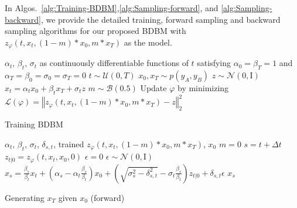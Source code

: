 In Algos.~\ref{alg:Training-BDBM},\ref{alg:Sampling-forward}, and
\ref{alg:Sampling-backward}, we provide the detailed training, forward
sampling and backward sampling algorithms for our proposed BDBM with
$z_{\varphi}\left(t,x_{t},\left(1-m\right)*x_{0},m*x_{T}\right)$
as the model.

\begin{algorithm}
\begin{algorithmic}[1]
 $\alpha_t$, $\beta_t$, $\sigma_t$ as continuously differentiable functions of $t$ satisfying  $\alpha_{0}=\beta_{T}=1$ and $\alpha_{T}=\beta_{0}=\sigma_{0}=\sigma_{T}=0$     
\Repeat     
	\State $t \sim \mathcal{U} \left(0,T \right)$ 
	\State $x_0, x_T \sim p(y_A, y_B)$     
	\State $z \sim \mathcal{N}(0, \mathrm{I})$     
	\State $x_t = \alpha_t x_0 + \beta_t x_T + \sigma_t z$     
	\State $m \sim \mathcal{B}(0.5)$     
	\State Update $\varphi$ by minimizing $\mathcal{L}(\varphi) = \left\Vert z_{\varphi}\left(t,x_{t},\left(1-m\right)*x_{0},m*x_{T}\right)-z\right\Vert _{2}^{2}$     
\end{algorithmic}\caption{Training BDBM \label{alg:Training-BDBM}}
\end{algorithm}

\begin{algorithm}
\begin{algorithmic}[1] 
 $\alpha_t$, $\beta_t$, $\sigma_t$, $\delta_{s,t}$, trained $z_{\varphi}\left(t,x_{t},\left(1-m\right)*x_{0},m*x_{T}\right)$, $x_0$
\State $m=0$
	\State $s = t + \Delta t$
	\State $z_{t|0} = z_{\varphi}\left(t,x_{t},x_{0},0\right)$
		\State $\epsilon = 0$
    \Else         
		\State $\epsilon \sim \mathcal{N}(0, \mathrm{I})$
    \EndIf     
	\State $x_{s}= \frac{\beta_{s}}{\beta_{t}} x_{t} + \left(\alpha_{s} - \alpha_{t}\frac{\beta_{s}}{\beta_{t}}\right)x_{0} + \left(\sqrt{\sigma_{s}^{2}-\delta_{s,t}^{2}}-\sigma_{t}\frac{\beta_{s}}{\beta_{t}}\right) z_{t|0} + \delta_{s,t} \epsilon$
\EndFor
\State 
\Return $x_{s}$ 
\end{algorithmic}

\caption{Generating $x_{T}$ given $x_{0}$ (forward)\label{alg:Sampling-forward}}
\end{algorithm}

